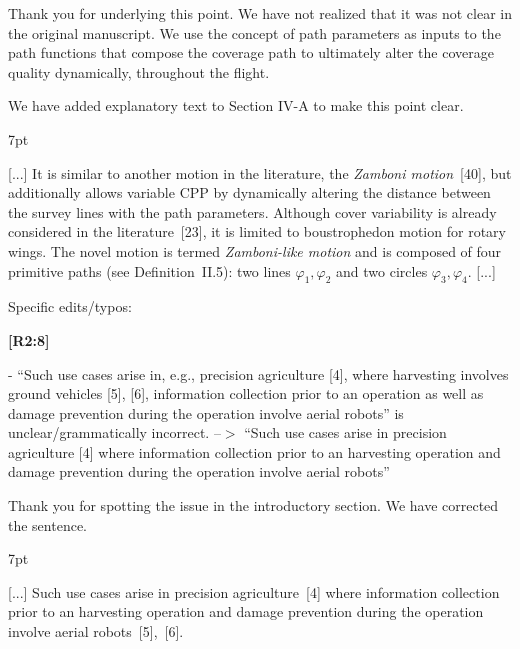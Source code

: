 \documentclass[10pt]{letter}
\newenvironment{formal}{%
  \def\FrameCommand{%
    \hspace{1pt}%
    {\color{red}\vrule width 2pt}%
    {\color{formalshade}\vrule width 4pt}%
    \colorbox{formalshade}%
  }%
  \MakeFramed{\advance\hsize-\width\FrameRestore}%
  \noindent\hspace{-4.55pt}%
  \begin{adjustwidth}{}{7pt}%
  \vspace{2pt}\vspace{2pt}%
}
{%
  \vspace{2pt}\end{adjustwidth}\endMakeFramed%
}
\begin{document}
{\color{blue} 
  
{\hspace*{-4.5em}{[R2:7]}\vspace*{-1.9em}}
  
Thank you for underlying this point. We have not realized that it was not clear in the original manuscript. We use the concept of path parameters as inputs to the path functions that compose the coverage path to ultimately alter the coverage quality dynamically, throughout the flight.

We have added explanatory text to Section IV-A to make this point clear.

\begin{formal}
  \color{black}
  [...] It is similar to another motion in the literature, the \emph{Zamboni motion}~[{\color{green}40}], but additionally allows variable CPP %
  {\color{blue} by dynamically altering the distance between the survey lines with the path parameters}. 
  {\color{blue} Although cover variability is already considered in the literature~[{\color{green}23}], it is limited to boustrophedon motion for rotary wings.}
  The novel motion is termed \emph{Zamboni-like motion} and is composed of four primitive paths (see Definition~{\color{red}II.5}): two lines $\varphi_1,\varphi_2$ and two circles $\varphi_3,\varphi_4$. [...]%
  \vspace*{1ex}
\end{formal}
}


\vspace{2em}

Specific edits/typos: 

{\hspace*{-4.5em}\textbf{[R2:8]}\vspace*{-1.9em}}

- ``Such use cases arise in, e.g., precision agriculture [4], where harvesting involves ground vehicles [5], [6], information collection prior to an operation as well as damage prevention during the operation involve aerial robots'' is unclear/grammatically incorrect. --$>$	``Such use cases arise in precision agriculture [4] where information collection prior to an harvesting operation and damage prevention during the operation involve aerial robots''
  
{\color{blue}

{\hspace*{-4.5em}{[R2:8]}\vspace*{-1.9em}}

Thank you for spotting the issue in the introductory section. We have corrected the sentence.

\begin{formal}
  \color{black} [...] Such use cases arise in precision agriculture~[{\color{green}4}] where {\color{blue}information collection prior to an harvesting operation and} damage prevention during the operation involve aerial robots~[{\color{green}5}],~[{\color{green}6}].

  \vspace*{1ex}
\end{formal}

}
\end{document}
